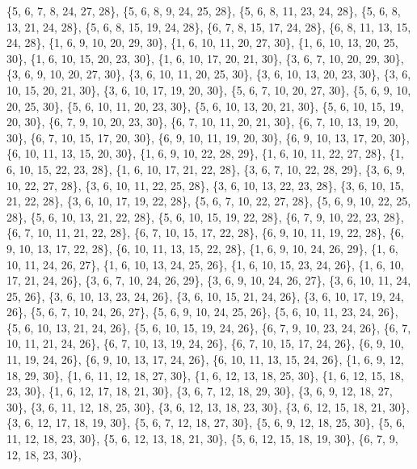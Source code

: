 \documentclass[11pt,a4paper]{article}
\begin{document}
{\{5, 6, 7, 8, 24, 27, 28\}, \{5, 6, 8, 9, 24, 25, 28\}, \{5, 6, 8, 11, 23, 24, 28\}, \{5, 6, 8, 13, 21, 24, 28\}, \{5, 6, 8, 15, 19, 24, 28\},
\{6, 7, 8, 15, 17, 24, 28\}, \{6, 8, 11, 13, 15, 24, 28\}, \{1, 6, 9, 10, 20, 29, 30\}, \{1, 6, 10, 11, 20, 27, 30\}, \{1, 6, 10, 13, 20, 25, 30\},
\{1, 6, 10, 15, 20, 23, 30\}, \{1, 6, 10, 17, 20, 21, 30\}, \{3, 6, 7, 10, 20, 29, 30\}, \{3, 6, 9, 10, 20, 27, 30\}, \{3, 6, 10, 11, 20, 25, 30\},
\{3, 6, 10, 13, 20, 23, 30\}, \{3, 6, 10, 15, 20, 21, 30\}, \{3, 6, 10, 17, 19, 20, 30\}, \{5, 6, 7, 10, 20, 27, 30\}, \{5, 6, 9, 10, 20, 25, 30\},
\{5, 6, 10, 11, 20, 23, 30\}, \{5, 6, 10, 13, 20, 21, 30\}, \{5, 6, 10, 15, 19, 20, 30\}, \{6, 7, 9, 10, 20, 23, 30\}, \{6, 7, 10, 11, 20, 21, 30\},
\{6, 7, 10, 13, 19, 20, 30\}, \{6, 7, 10, 15, 17, 20, 30\}, \{6, 9, 10, 11, 19, 20, 30\}, \{6, 9, 10, 13, 17, 20, 30\}, \{6, 10, 11, 13, 15, 20, 30\},
\{1, 6, 9, 10, 22, 28, 29\}, \{1, 6, 10, 11, 22, 27, 28\}, \{1, 6, 10, 15, 22, 23, 28\}, \{1, 6, 10, 17, 21, 22, 28\}, \{3, 6, 7, 10, 22, 28, 29\},
\{3, 6, 9, 10, 22, 27, 28\}, \{3, 6, 10, 11, 22, 25, 28\}, \{3, 6, 10, 13, 22, 23, 28\}, \{3, 6, 10, 15, 21, 22, 28\}, \{3, 6, 10, 17, 19, 22, 28\},
\{5, 6, 7, 10, 22, 27, 28\}, \{5, 6, 9, 10, 22, 25, 28\}, \{5, 6, 10, 13, 21, 22, 28\}, \{5, 6, 10, 15, 19, 22, 28\}, \{6, 7, 9, 10, 22, 23, 28\},
\{6, 7, 10, 11, 21, 22, 28\}, \{6, 7, 10, 15, 17, 22, 28\}, \{6, 9, 10, 11, 19, 22, 28\}, \{6, 9, 10, 13, 17, 22, 28\}, \{6, 10, 11, 13, 15, 22, 28\},
\{1, 6, 9, 10, 24, 26, 29\}, \{1, 6, 10, 11, 24, 26, 27\}, \{1, 6, 10, 13, 24, 25, 26\}, \{1, 6, 10, 15, 23, 24, 26\}, \{1, 6, 10, 17, 21, 24, 26\},
\{3, 6, 7, 10, 24, 26, 29\}, \{3, 6, 9, 10, 24, 26, 27\}, \{3, 6, 10, 11, 24, 25, 26\}, \{3, 6, 10, 13, 23, 24, 26\}, \{3, 6, 10, 15, 21, 24, 26\},
\{3, 6, 10, 17, 19, 24, 26\}, \{5, 6, 7, 10, 24, 26, 27\}, \{5, 6, 9, 10, 24, 25, 26\}, \{5, 6, 10, 11, 23, 24, 26\}, \{5, 6, 10, 13, 21, 24, 26\},
\{5, 6, 10, 15, 19, 24, 26\}, \{6, 7, 9, 10, 23, 24, 26\}, \{6, 7, 10, 11, 21, 24, 26\}, \{6, 7, 10, 13, 19, 24, 26\}, \{6, 7, 10, 15, 17, 24, 26\},
\{6, 9, 10, 11, 19, 24, 26\}, \{6, 9, 10, 13, 17, 24, 26\}, \{6, 10, 11, 13, 15, 24, 26\}, \{1, 6, 9, 12, 18, 29, 30\}, \{1, 6, 11, 12, 18, 27, 30\},
\{1, 6, 12, 13, 18, 25, 30\}, \{1, 6, 12, 15, 18, 23, 30\}, \{1, 6, 12, 17, 18, 21, 30\}, \{3, 6, 7, 12, 18, 29, 30\}, \{3, 6, 9, 12, 18, 27, 30\},
\{3, 6, 11, 12, 18, 25, 30\}, \{3, 6, 12, 13, 18, 23, 30\}, \{3, 6, 12, 15, 18, 21, 30\}, \{3, 6, 12, 17, 18, 19, 30\}, \{5, 6, 7, 12, 18, 27, 30\},
\{5, 6, 9, 12, 18, 25, 30\}, \{5, 6, 11, 12, 18, 23, 30\}, \{5, 6, 12, 13, 18, 21, 30\}, \{5, 6, 12, 15, 18, 19, 30\}, \{6, 7, 9, 12, 18, 23, 30\},
}
\end{document}
